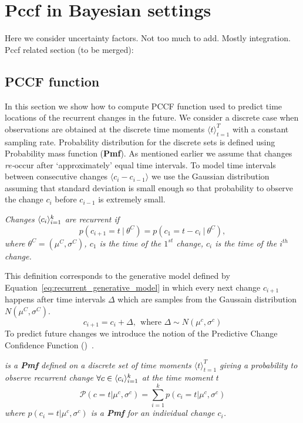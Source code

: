 \section{Pccf in Bayesian settings}
Here we consider uncertainty factors.
Not too much to add. 
Mostly integration.
Pccf related section (to be merged): 

\subsection{PCCF function}
\label{subsec:pccf}
In this section we show how to compute PCCF function used to predict time locations of the recurrent changes in the future.
We consider a discrete case when observations are obtained at the discrete time moments $\langle t \rangle_{t=1}^T$ with a constant sampling rate.
Probability distribution for the discrete sets is defined using Probability mass function (\textbf{Pmf}).
As mentioned earlier we assume that changes \textit{re-}occur after `approximately' equal time intervals.
To model time intervals between consecutive changes $\langle c_i - c_{i-1} \rangle$ we use the Gaussian distribution assuming that standard deviation is small enough so that probability to observe the change $c_i$ before $c_{i-1}$ is extremely small.
\begin{definition}
    \label{def:recurrentdefinition}
    \textit{
        Changes $\langle c_i \rangle_{i=1}^k$ are recurrent if
    }
    \begin{equation}
        p(c_{i+1} = t \: | \: \theta^C) = p(c_1 = t - c_{i} \: | \: \theta^C),
        \label{eq:procnorefs}
    \end{equation}
    \textit{
        where
        $\theta^C=(\mu^C,\sigma^C)$,
        $c_1$ is the time of the $1^{st}$ change,
        $c_i$ is the time of the $i^{th}$ change.
    }
\end{definition}
%
This definition corresponds to the generative model defined by
Equation~\ref{eq:recurrent_generative_model} in which every next
change $c_{i+1}$ happens after time intervals $\Delta$ which are
samples from the Gaussain distribution $N(\mu^C, \sigma^C)$.
\begin{equation}
    c_{i+1} = c_i + \Delta,~~\text{where } \Delta \sim N(\mu^c, \sigma^c)
    \label{eq:recurrent_generative_model}
\end{equation}
%
To predict future changes we introduce the notion of the
Predictive Change Confidence Function (\PCCF)~\cite{MaslovSDM2016}.
\begin{definition}
    \label{def:pccf_definition}
    \textit{
        \PCCF is a \textbf{Pmf} defined on a discrete set of time moments
        $\langle t \rangle_{t=1}^T$ giving a probability
        to observe recurrent change $\forall c \in \langle  c_i  \rangle_{i=1}^k$
        at the time moment $t$
    }
    \begin{equation}
        \mathcal{P}(c=t|\mu^c,\sigma^c)=\sum_{i=1}^{k} p(c_i=t|\mu^c,\sigma^c)
    \end{equation}
    \textit{
        where $p(c_i=t|\mu^c,\sigma^c)$ is a \textbf{Pmf} for an
        individual change $c_i$.
    }
\end{definition}
